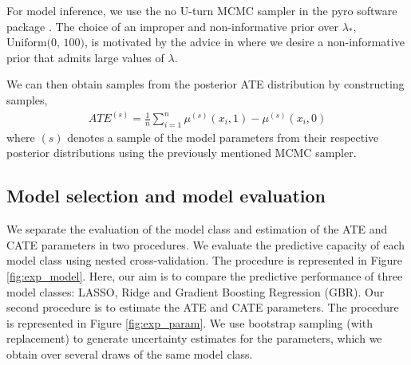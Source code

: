 \documentclass[12pt, a4paper]{article}
\begin{document}
For model inference, we use the no U-turn MCMC sampler \citep{hoffman2014} in
the pyro software package \citep{bingham2019}. The choice of an improper and
non-informative prior over $\lambda_*$, $\textrm{Uniform(0, 100)}$, is
motivated by the advice in \citet{gelman2006} where we desire a non-informative
prior that admits large values of $\lambda$. 

We can then obtain samples from the posterior ATE distribution by constructing
samples,
\begin{align*}
  ATE^{(s)} = \frac{1}{n} \sum_{i=1}^{n} \mu^{(s)}(x_i, 1) - \mu^{(s)}(x_i, 0)
\end{align*}
where $(s)$ denotes a sample of the model parameters from their respective
posterior distributions using the previously mentioned MCMC sampler.


%




\subsection{Model selection and model evaluation}

We separate the evaluation of the model class and estimation of the ATE and CATE parameters in two procedures. We evaluate the predictive capacity of each model class using nested cross-validation. The procedure is represented in Figure \ref{fig:exp_model}. Here, our aim is to compare the predictive performance of three model classes: LASSO, Ridge and Gradient Boosting Regression (GBR). Our second procedure is to estimate the ATE and CATE parameters. The procedure is represented in Figure \ref{fig:exp_param}. We use bootstrap sampling (with replacement) to generate uncertainty estimates for the parameters, which we obtain over several draws of the same model class. 
\end{document}

